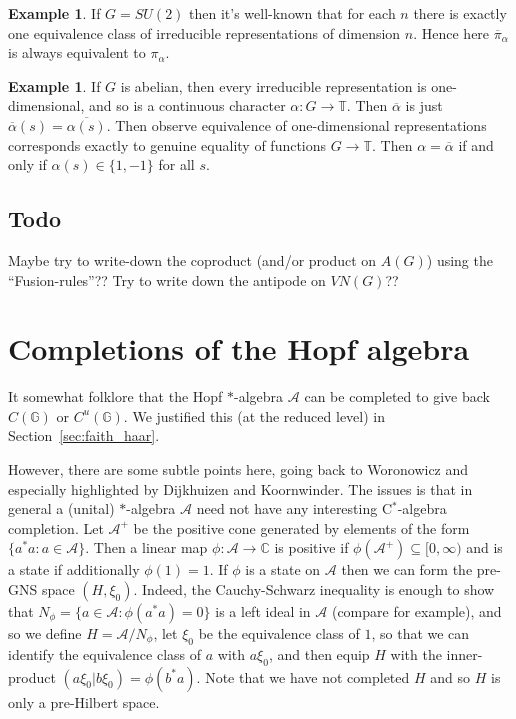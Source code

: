 \documentclass[twoside,a4paper,12pt]{article}
\theoremstyle{plain}
\theoremstyle{definition}
\newtheorem{example}[proposition]{Example}
\newcommand{\mc}{\mathcal}
\newcommand{\G}{{\mathbb G}}
\begin{document}
\begin{example}
If $G=SU(2)$ then it's well-known that for each $n$ there is exactly one
equivalence class of irreducible representations of dimension $n$.  Hence
here $\overline{\pi}_\alpha$ is always equivalent to $\pi_\alpha$.
\end{example}

\begin{example}
If $G$ is abelian, then every irreducible representation is one-dimensional,
and so is a continuous character $\alpha:G\rightarrow\mathbb T$.  Then
$\overline\alpha$ is just $\overline\alpha(s) = \overline{\alpha(s)}$.
Then observe equivalence of one-dimensional representations corresponds
exactly to genuine equality of functions $G\rightarrow\mathbb T$.  Then
$\alpha = \overline\alpha$ if and only if $\alpha(s)\in\{1,-1\}$ for all $s$.
\end{example}


\subsection{Todo}

Maybe try to write-down the coproduct (and/or product on $A(G)$) using
the ``Fusion-rules''??  Try to write down the antipode on $VN(G)$??




\section{Completions of the Hopf algebra}

It somewhat folklore that the Hopf $*$-algebra $\mc A$ can be completed to
give back $C(\G)$ or $C^u(\G)$.  We justified this (at the reduced level)
in Section~\ref{sec:faith_haar}.

However, there are some subtle points here, going back to Woronowicz and
especially highlighted by Dijkhuizen and Koornwinder.  The issues is that
in general a (unital) $*$-algebra $\mc A$ need not have any interesting
C$^*$-algebra completion.  Let $\mc A^+$ be the positive cone generated
by elements of the form $\{ a^*a : a\in\mc A \}$.  Then a linear map
$\phi:\mc A\rightarrow\mathbb C$ is positive if $\phi(\mc A^+)\subseteq
[0,\infty)$ and is a state if additionally $\phi(1)=1$.
If $\phi$ is a state on $\mc A$ then we can form
the pre-GNS space $(H,\xi_0)$.  Indeed, the Cauchy-Schwarz inequality is
enough to show that $N_\phi=\{a\in\mc A:\phi(a^*a)=0\}$ is a left ideal
in $\mc A$ (compare \cite[Chapter~I, Lemma~9.6]{tak1} for example), and so
we define $H = \mc A/N_\phi$, let $\xi_0$ be the equivalence class of $1$,
so that we can identify the equivalence class of $a$ with $a\xi_0$, and then
equip $H$ with the inner-product $(a\xi_0|b\xi_0) = \phi(b^*a)$.  Note that
we have not completed $H$ and so $H$ is only a pre-Hilbert space.
\end{document}
